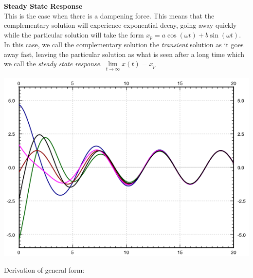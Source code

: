 \documentclass[11pt, fleqn]{article}
\begin{document}
\textbf{Steady State Response}\\
This is the case when there is a dampening force. This means that the complementary solution will experience exponential decay, going away quickly while the particular solution will take the form $x_p=a\cos(\omega t)+b\sin(\omega t)$. In this case, we call the complementary solution the \textit{transient} solution as it goes away fast, leaving the particular solution as what is seen after a long time which we call the \textit{steady state response}. $\lim\limits_{t\to\infty}x(t)=x_p$\\
\centerline{\includegraphics[scale=0.8]{ODEPictures/steadyStateResponse.png}}
Derivation of general form:
\end{document}
